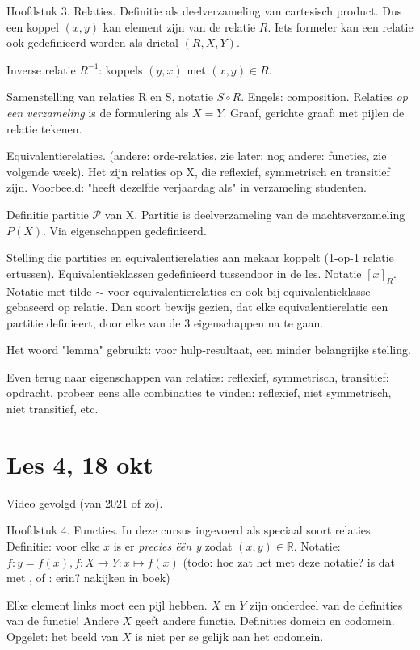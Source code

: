 \documentclass{article}
\begin{document}
Hoofdstuk 3. Relaties. Definitie als deelverzameling van cartesisch product. Dus een koppel $(x,y)$ kan element zijn van de relatie $R$. Iets formeler kan een relatie ook gedefinieerd worden als drietal $(R,X,Y)$. 

Inverse relatie $R^{-1}$: koppels $(y,x)$ met $(x,y) \in R$. 

Samenstelling van relaties R en S, notatie $S \circ R$. Engels: composition. Relaties \emph{op een verzameling} is de formulering als $X=Y$. Graaf, gerichte graaf: met pijlen de relatie tekenen. 

Equivalentierelaties. (andere: orde-relaties, zie later; nog andere: functies, zie volgende week). Het zijn relaties op X, die reflexief, symmetrisch en transitief zijn. Voorbeeld: "heeft dezelfde verjaardag als" in verzameling studenten. 

Definitie partitie $\mathcal{P} $ van X. Partitie is deelverzameling van de machtsverzameling $P(X)$. Via eigenschappen gedefinieerd. 

Stelling die partities en equivalentierelaties aan mekaar koppelt (1-op-1 relatie ertussen). Equivalentieklassen gedefinieerd tussendoor in de les. Notatie $[x]_R$. Notatie met tilde $\sim$ voor equivalentierelaties en ook bij equivalentieklasse gebaseerd op relatie.  Dan soort bewijs gezien, dat elke equivalentierelatie een partitie definieert, door elke van de 3 eigenschappen na te gaan. 

Het woord "lemma" gebruikt: voor hulp-resultaat, een minder belangrijke stelling. 

Even terug naar eigenschappen van relaties: reflexief, symmetrisch, transitief: opdracht, probeer eens alle combinaties te vinden: reflexief, niet symmetrisch, niet transitief, etc. 


\section{Les 4, 18 okt}
Video gevolgd (van 2021 of zo). 

Hoofdstuk 4. Functies. In deze cursus ingevoerd als speciaal soort relaties. Definitie: voor elke $x$ is er \emph{precies \"e\"en y} zodat $(x,y) \in \mathbb{R}$. 
Notatie: $f: y=f(x), f:X \rightarrow  Y: x \mapsto f(x)$
(todo: hoe zat het met deze notatie? is dat met , of : erin? nakijken in boek) 

Elke element links moet een pijl hebben. $X$ en $Y$ zijn onderdeel van de definities van de functie! Andere $X$ geeft andere functie. 
Definities domein en codomein. Opgelet: het beeld van $X$ is niet per se gelijk aan het codomein. 
\end{document}
